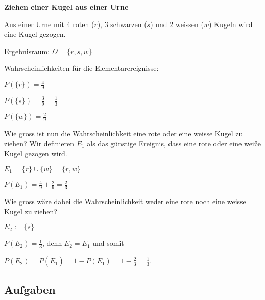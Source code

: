 \begin{beispiel}{}{}\textbf{Ziehen einer Kugel aus einer Urne}

Aus einer Urne mit 4 roten ($r$), 3 schwarzen ($s$) und 2 weissen ($w$) Kugeln wird eine Kugel gezogen.

Ergebnisraum: $\Omega = \{r, s, w\}$



Wahrscheinlichkeiten für die Elementarereignisse:

$P(\{r\}) = \frac49$

$P(\{s\}) = \frac39 = \frac13$

$P(\{w\}) = \frac29$

Wie gross ist nun die Wahrscheinlichkeit eine rote oder eine weisse Kugel zu ziehen?
Wir definieren $E_1$ als das günstige Ereignis, dass eine rote oder eine weiße Kugel gezogen wird.

$E_1 = \{r\} \cup \{w\} = \{r,w\}$

$P(E_1) = \frac49 + \frac29 = \frac23$



Wie gross wäre dabei die Wahrscheinlichkeit weder eine rote noch eine weisse Kugel zu ziehen?

$E_2 := \{s\}$

$P(E_2) = \frac13$, denn $E_2 = \overline{E_1}$ und somit

$P(E_2) = P(\overline{E_1}) = 1 - P(E_1) = 1 - \frac23 = \frac13$.

\end{beispiel}

\subsection*{Aufgaben}

\newpage


